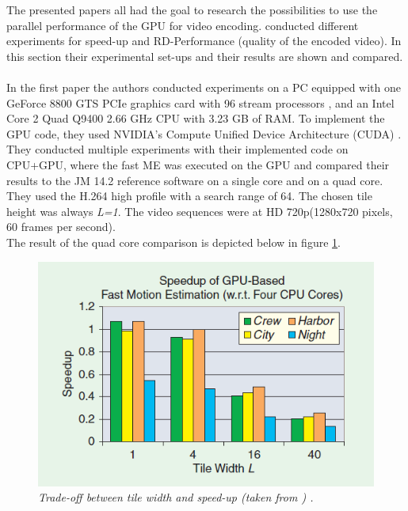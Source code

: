 The presented papers all had the goal to research the possibilities to use the parallel performance of the GPU for video encoding. 
 conducted different experiments for speed-up and RD-Performance (quality of the encoded video). 
In this section their experimental set-ups and their results are shown and compared.\\
\\
In the first paper \cite{Paper1} the authors conducted experiments on a PC equipped with one GeForce 8800 GTS PCIe graphics card with 96 stream processors \cite{geforce8800}, 
and an Intel Core 2 Quad Q9400 2.66 GHz CPU with 3.23 GB of RAM. To implement the GPU code, they used NVIDIA's Compute Unified Device Architecture (CUDA) \cite{nvidia2programming}. \\
They conducted multiple experiments with their implemented code on CPU+GPU, where the fast ME was executed on the GPU and compared their results to the JM 14.2 reference software on a single core and on a quad core. 
They used the H.264 high profile with a search range of 64. The chosen tile height was always \textit{L=1}. The video sequences were at HD 720p(1280x720 pixels, 60 frames per second).\\
The result of the quad core comparison is depicted below in figure \ref{tiling_speedup_mc}.
\begin{figure}[H]
\centerline{\includegraphics[scale=0.4]{pics/tiling_speedup_mc}} %
\caption{\label{tiling_speedup_mc}{
\it Trade-off between tile width and speed-up (taken from \cite{Paper1})
.
}}
\end{figure} 

